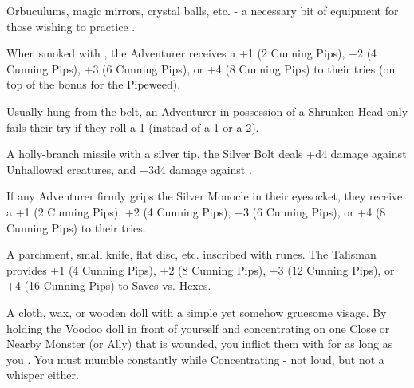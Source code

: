 \MARVELS[
  Name=Scrying Vessel,
  Link=marvels-scrying-vessel,
  Pips=4
]

Orbuculums, magic mirrors, crystal balls, etc. - a necessary bit of equipment for those wishing to practice .

\MARVELS[
  Name=Seer's Pipe,
  Link=marvels-seers-pipe,
  Pips=2+
]

When smoked with , the Adventurer receives a +1 (2 Cunning Pips), +2 (4 Cunning Pips), +3 (6 Cunning Pips), or +4 (8 Cunning Pips) to their  tries (on top of the bonus for the Pipeweed).

\MARVELS[
  Name=Shrunken Head,
  Link=marvels-shrunken-head,
  Pips=8
]

Usually hung from the belt, an Adventurer in possession of a Shrunken Head only fails their  try if they roll a 1 (instead of a 1 or a 2).



\MARVELS[
  Name=Silver Bolt,
  Link=marvels-silver-bolt,
  Pips=2
]

A holly-branch missile with a silver tip, the Silver Bolt deals +d4 damage against Unhallowed creatures, and +3d4 damage against . 

\cbreak

\MARVELS[
  Name=Silver Monocle,
  Link=marvels-silver-monocle,
  Pips=2+
]

If any Adventurer firmly grips the Silver Monocle in their eyesocket, they receive a +1 (2 Cunning Pips), +2 (4 Cunning Pips), +3 (6 Cunning Pips), or +4 (8 Cunning Pips) to their  tries.

 
\MARVELS[
  Name=Talisman,
  Link=marvels-talisman,
  Pips=4+
]

A parchment, small knife, flat disc, etc. inscribed with runes. The Talisman provides +1 (4 Cunning Pips), +2 (8 Cunning Pips), +3 (12 Cunning Pips), or +4 (16 Cunning Pips) to Saves vs. Hexes.


\MARVELS[
  Name=Voodoo Doll,
  Link=marvels-voodoo-doll,
  Pips=12
]

A cloth, wax, or wooden doll with a simple yet somehow gruesome visage. By holding the Voodoo doll in front of yourself and concentrating on one Close or Nearby Monster (or Ally) that is wounded, you inflict them with  for as long as you . You must mumble constantly while Concentrating - not loud, but not a whisper either.

